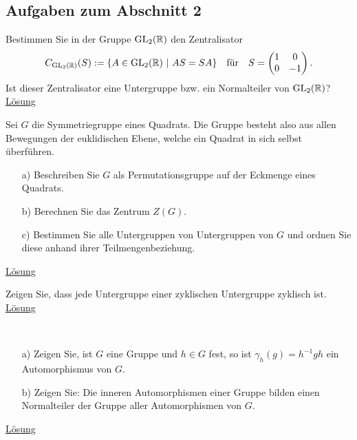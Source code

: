 \subsection{Aufgaben zum Abschnitt 2}

\begin{exe}\label{aufgabe:2.1} 
	Bestimmen Sie in der Gruppe $ \operatorname{GL}_2(\mathbb{R}) $ den Zentralisator
	\begin{align*}
	C_{\operatorname{GL}_2(\mathbb{R})}(S) := \lbrace A \in \operatorname{GL}_2(\mathbb{R}) \ | \ AS = SA \rbrace
	\quad
	\text{für}
	\quad
	S = 
	\begin{pmatrix}
	1 & 0 \\
	0 & -1
	\end{pmatrix}.
	\end{align*}
	Ist dieser Zentralisator eine Untergruppe bzw. ein Normalteiler von $ \operatorname{GL}_2(\mathbb{R}) $?
	\hyperlink{loes:2.1}{Lösung}
\end{exe}

\begin{exe}\label{aufgabe:2.2} 
	Sei $ G $ die Symmetriegruppe eines Quadrats.
	Die Gruppe besteht also aus allen Bewegungen der euklidischen Ebene, welche ein Quadrat in sich selbst überführen.
	\begin{itemize}
		\item[a)]
		Beschreiben Sie $ G $ als Permutationsgruppe auf der Eckmenge eines Quadrats.
		\item[b)] 
		Berechnen Sie das Zentrum $ Z(G) $.
		\item[c)]
		Bestimmen Sie alle Untergruppen von Untergruppen von $ G $ und ordnen Sie diese anhand ihrer Teilmengenbeziehung. 
	\end{itemize}
	\hyperlink{loes:2.2}{Lösung}
\end{exe}

\begin{exe}\label{aufgabe:2.3} 
	Zeigen Sie, dass jede Untergruppe einer zyklischen Untergruppe zyklisch ist.
	\hyperlink{loes:2.3}{Lösung}
\end{exe}

\begin{exe}\ \label{aufgabe:2.4} 
	\begin{enumerate}
		\item[a)]
		Zeigen Sie, ist $ G $ eine Gruppe und $ h \in G $ fest, so ist $ \gamma_h(g) = h^{-1}g h $
		ein Automorphismus von $ G $.
		\item[b)] 
		Zeigen Sie: 
		Die inneren Automorphismen einer Gruppe bilden einen Normalteiler der Gruppe aller Automorphismen von $ G $.
	\end{enumerate}
	\hyperlink{loes:2.4}{Lösung}
\end{exe}


